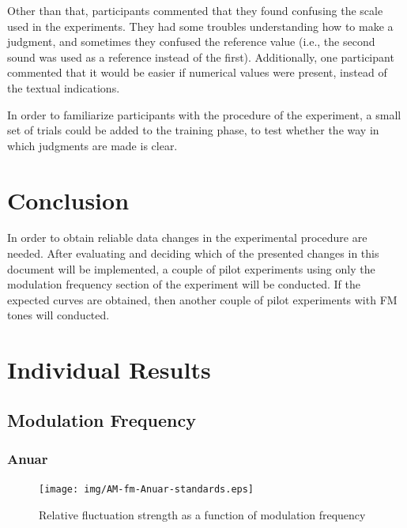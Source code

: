 \documentclass[a4paper]{article}
\begin{document}
Other than that, participants commented that they found confusing the scale
used in the experiments. They had some troubles understanding how to make a
judgment, and sometimes they confused the reference value (i.e., the second
sound was used as a reference instead of the first). Additionally, one
participant commented that it would be easier if numerical values were present,
instead of the textual indications.

In order to familiarize participants with the procedure of the experiment, a
small set of trials could be added to the training phase, to test whether the
way in which judgments are made is clear.


\section{Conclusion} %
\label{sec:conclusion}

In order to obtain reliable data changes in the experimental procedure are
needed. After evaluating and deciding which of the presented changes in this
document will be implemented, a couple of pilot experiments using only the
modulation frequency section of the experiment will be conducted. If the
expected curves are obtained, then another couple of pilot experiments with
FM tones will conducted.


\clearpage

\appendix

\section{Individual Results}

\subsection{Modulation Frequency}

\subsubsection{Anuar}

\begin{figure}[H]
  \centering
  \texttt{[image: img/AM-fm-Anuar-standards.eps]}
  \caption{Relative fluctuation strength as a function of modulation frequency}
\label{fig:fm-anuar}
\end{figure}
\end{document}
